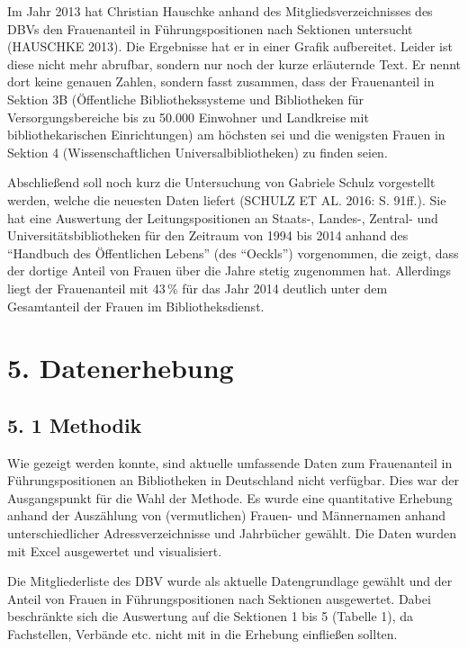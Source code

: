 \documentclass[a4paper,
fontsize=11pt,
oneside,
numbers=noperiodatend,
parskip=half-,
bibliography=totoc,
final
]{scrartcl}
\begin{document}
Im Jahr 2013 hat Christian Hauschke anhand des Mitgliedsverzeichnisses
des DBVs den Frauenanteil in Führungspositionen nach Sektionen
untersucht (HAUSCHKE 2013). Die Ergebnisse hat er in einer Grafik
aufbereitet. Leider ist diese nicht mehr abrufbar, sondern nur noch der
kurze erläuternde Text. Er nennt dort keine genauen Zahlen, sondern
fasst zusammen, dass der Frauenanteil in Sektion 3B (Öffentliche
Bibliothekssysteme und Bibliotheken für Versorgungsbereiche bis zu
50.000 Einwohner und Landkreise mit bibliothekarischen Einrichtungen) am
höchsten sei und die wenigsten Frauen in Sektion 4 (Wissenschaftlichen
Universalbibliotheken) zu finden seien.

Abschließend soll noch kurz die Untersuchung von Gabriele Schulz
vorgestellt werden, welche die neuesten Daten liefert (SCHULZ ET AL.
2016: S. 91ff.). Sie hat eine Auswertung der Leitungspositionen an
Staats-, Landes-, Zentral- und Universitätsbibliotheken für den Zeitraum
von 1994 bis 2014 anhand des \enquote{Handbuch des Öffentlichen Lebens}
(des \enquote{Oeckls}) vorgenommen, die zeigt, dass der dortige Anteil
von Frauen über die Jahre stetig zugenommen hat. Allerdings liegt der
Frauenanteil mit 43\,\% für das Jahr 2014 deutlich unter dem Gesamtanteil
der Frauen im Bibliotheksdienst.

\hypertarget{datenerhebung}{%
\section{5. Datenerhebung}\label{datenerhebung}}

\hypertarget{methodik}{%
\subsection{5. 1 Methodik}\label{methodik}}

Wie gezeigt werden konnte, sind aktuelle umfassende Daten zum
Frauenanteil in Führungspositionen an Bibliotheken in Deutschland nicht
verfügbar. Dies war der Ausgangspunkt für die Wahl der Methode. Es wurde
eine quantitative Erhebung anhand der Auszählung von (vermutlichen)
Frauen- und Männernamen anhand unterschiedlicher Adressverzeichnisse und
Jahrbücher gewählt. Die Daten wurden mit Excel ausgewertet und
visualisiert.

Die Mitgliederliste des DBV wurde als aktuelle Datengrundlage gewählt
und der Anteil von Frauen in Führungspositionen nach Sektionen
ausgewertet. Dabei beschränkte sich die Auswertung auf die Sektionen 1
bis 5 (Tabelle 1), da Fachstellen, Verbände etc. nicht mit in die
Erhebung einfließen sollten.
\end{document}
